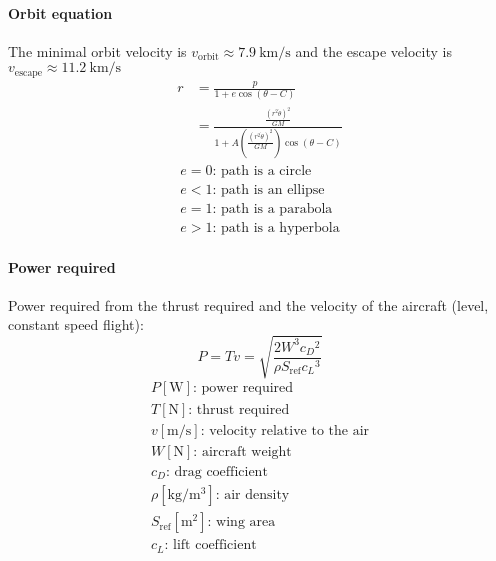 \documentclass[10pt, twocolumn]{article}
\begin{document}
\paragraph{Orbit equation}
The minimal orbit velocity is \(v_\mathrm{orbit} \approx \SI{7.9}{\kilo\metre\per\second}\) and the escape velocity is \(v_\mathrm{escape} \approx \SI{11.2}{\kilo\metre\per\second}\)
\[
  \begin{split}
    r & = \frac{p}{1 + e \cos(\theta - C)} \\
    & = \frac{\frac{(r^2 \dot{\theta})^2}{GM}}{1 + A\left( \frac{(r^2 \dot{\theta})^2}{GM} \right) \cos(\theta - C)}
  \end{split}
\]
\[
  \begin{array}{|l}
    e = 0 \text{: path is a circle}   \\
    e < 1 \text{: path is an ellipse} \\
    e = 1 \text{: path is a parabola} \\
    e >1 \text{: path is a hyperbola}
  \end{array}
\]


\paragraph{Power required}
Power required from the thrust required and the velocity of the aircraft (level, constant speed flight):
\[
  P = Tv = \sqrt{\frac{2W^3 {c_D}^2}{\rho S_\mathrm{ref} {c_L}^3}}
\]
\[
  \begin{array}{|l}
    P [\si{\watt}] \text{: power required}                           \\
    T [\si{\newton}] \text{: thrust required}                        \\
    v [\si{\meter\per\second}] \text{: velocity relative to the air} \\
    W [\si{\newton}] \text{: aircraft weight}                        \\
    c_D \text{: drag coefficient}                                    \\
    \rho [\si{\kilogram\per\meter\cubed}] \text{: air density}       \\
    S_\mathrm{ref} [\si{\metre\squared}] \text{: wing area}          \\
    c_L \text{: lift coefficient}
  \end{array}
\]
\end{document}
